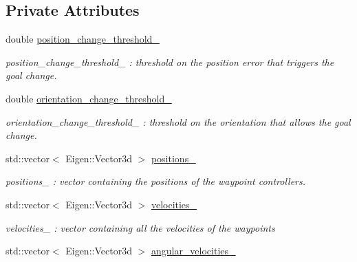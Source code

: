 \subsection*{Private Attributes}
\begin{DoxyCompactItemize}
\item 
\hypertarget{class_waypoint_controller_a1529bd3b5d8b471f017e7e43481bf37a}{double \hyperlink{class_waypoint_controller_a1529bd3b5d8b471f017e7e43481bf37a}{position\-\_\-change\-\_\-threshold\-\_\-}}\label{class_waypoint_controller_a1529bd3b5d8b471f017e7e43481bf37a}

\begin{DoxyCompactList}\small\item\em position\-\_\-change\-\_\-threshold\-\_\- \-: threshold on the position error that triggers the goal change. \end{DoxyCompactList}\item 
\hypertarget{class_waypoint_controller_afd282df89cd96fc9afd14ff401616ae6}{double \hyperlink{class_waypoint_controller_afd282df89cd96fc9afd14ff401616ae6}{orientation\-\_\-change\-\_\-threshold\-\_\-}}\label{class_waypoint_controller_afd282df89cd96fc9afd14ff401616ae6}

\begin{DoxyCompactList}\small\item\em orientation\-\_\-change\-\_\-threshold\-\_\- \-: threshold on the orientation that allows the goal change. \end{DoxyCompactList}\item 
\hypertarget{class_waypoint_controller_afc7310047b62787226e1fc7802c32aad}{std\-::vector$<$ Eigen\-::\-Vector3d $>$ \hyperlink{class_waypoint_controller_afc7310047b62787226e1fc7802c32aad}{positions\-\_\-}}\label{class_waypoint_controller_afc7310047b62787226e1fc7802c32aad}

\begin{DoxyCompactList}\small\item\em positions\-\_\- \-: vector containing the positions of the waypoint controllers. \end{DoxyCompactList}\item 
\hypertarget{class_waypoint_controller_a0609521600ea43b7a3c50e436560153b}{std\-::vector$<$ Eigen\-::\-Vector3d $>$ \hyperlink{class_waypoint_controller_a0609521600ea43b7a3c50e436560153b}{velocities\-\_\-}}\label{class_waypoint_controller_a0609521600ea43b7a3c50e436560153b}

\begin{DoxyCompactList}\small\item\em velocities\-\_\- \-: vector containing all the velocities of the waypoints \end{DoxyCompactList}\item 
\hypertarget{class_waypoint_controller_ad56afddef4b8a1a8f89a8d19c0dd96b8}{std\-::vector$<$ Eigen\-::\-Vector3d $>$ \hyperlink{class_waypoint_controller_ad56afddef4b8a1a8f89a8d19c0dd96b8}{angular\-\_\-velocities\-\_\-}}\label{class_waypoint_controller_ad56afddef4b8a1a8f89a8d19c0dd96b8}


\end{DoxyCompactItemize}
